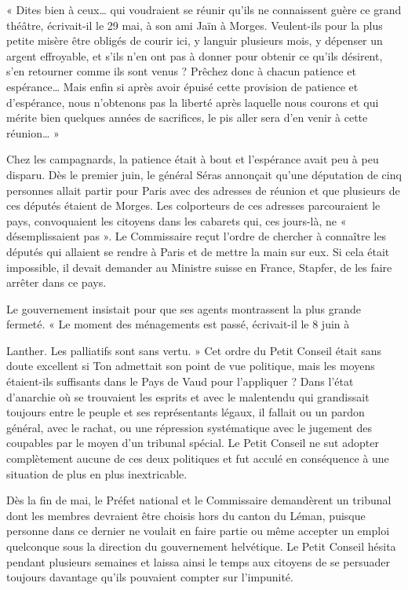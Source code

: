 \documentclass[french,twoside]{book} %
\newenvironment{quoteblock}%
  {\begin{quoting}}
  {\end{quoting}}
\newenvironment{quotebar}{%
    \def\FrameCommand{{\color{rubric!10!}\vrule width 0.5em} \hspace{0.9em}}%
    \def\OuterFrameSep{\itemsep} %
    \MakeFramed {\advance\hsize-\width \FrameRestore}
  }%
  {%
    \endMakeFramed
  }
\renewenvironment{quoteblock}%
  {%
    \savenotes
    \setstretch{0.9}
    \begin{quotebar}
  }
  {%
    \end{quotebar}
    \spewnotes
  }
\begin{document}
\begin{quoteblock}
 \noindent « Dites bien à ceux… qui voudraient se réunir qu’ils ne connaissent guère ce grand théâtre, écrivait-il le 29 mai, à son ami Jaïn à Morges. Veulent-ils pour la plus petite misère être obligés de courir ici, y languir plusieurs mois, y dépenser un argent effroyable, et s’ils n’en ont pas à donner pour obtenir ce qu’ils désirent, s’en retourner comme ils sont venus ? Prêchez donc à chacun patience et espérance… Mais enfin si après avoir épuisé cette provision de patience et d’espérance, nous n’obtenons pas la liberté après laquelle nous courons et qui mérite bien quelques années de sacrifices, le pis aller sera d’en venir à cette réunion… »
 \end{quoteblock}

\noindent Chez les campagnards, la patience était à bout et l’espérance avait peu à peu disparu. Dès le premier juin, le général Séras annonçait qu’une députation de cinq personnes allait partir pour Paris avec des adresses de réunion et que plusieurs de ces députés étaient de Morges. Les colporteurs de ces adresses parcouraient le pays, convoquaient les citoyens dans les cabarets qui, ces jours-là, ne « désemplissaient pas ». Le Commissaire reçut l’ordre de chercher à connaître les députés qui allaient se rendre à Paris et de mettre la main sur eux. Si cela était impossible, il devait demander au Ministre suisse en France, Stapfer, de les faire arrêter dans ce pays.\par
Le gouvernement insistait pour que ses agents montrassent la plus grande fermeté. « Le moment des ménagements est passé, écrivait-il le 8 juin à\par
Lanther. Les palliatifs sont sans vertu. » Cet ordre du Petit Conseil était sans doute excellent si Ton admettait son point de vue politique, mais les moyens étaient-ils suffisants dans le Pays de Vaud pour l’appliquer ? Dans l’état d’anarchie où se trouvaient les esprits et avec le malentendu qui grandissait toujours entre le peuple et ses représentants légaux, il fallait ou un pardon général, avec le rachat, ou une répression systématique avec le jugement des coupables par le moyen d’un tribunal spécial. Le Petit Conseil ne sut adopter complètement aucune de ces deux politiques et fut acculé en conséquence à une situation de plus en plus inextricable.\par
Dès la fin de mai, le Préfet national et le Commissaire demandèrent un tribunal dont les membres devraient être choisis hors du canton du Léman, puisque personne dans ce dernier ne voulait en faire partie ou même accepter un emploi quelconque sous la direction du gouvernement helvétique. Le Petit Conseil hésita pendant plusieurs semaines et laissa ainsi le temps aux citoyens de se persuader toujours davantage qu’ils pouvaient compter sur l’impunité.\par
\end{document}
